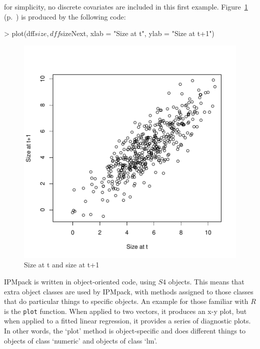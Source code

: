\documentclass{article}
\begin{document}
for simplicity, no discrete covariates are included in this first example. Figure~\ref{fig:zero} (p.~\pageref{fig:zero}) is produced by the following code:

\begin{Schunk}
\begin{Sinput}
> plot(dff$size, dff$sizeNext, xlab = "Size at t", ylab = "Size at t+1")
\end{Sinput}
\end{Schunk}
\begin{figure}
\begin{center}
\includegraphics{IPMpack_Vignette-fig0}
\end{center}
\caption{Size at t and size at t+1}
\label{fig:zero}
\end{figure}

IPMpack is written in object-oriented code, using $S4$ objects. This means that
extra object classes are used by IPMpack, with methods assigned to those classes
that do particular things to specific objects. An example for those familiar
with $R$ is the {\tt plot} function. When applied to two vectors, it produces an x-y plot, but when applied to a fitted linear regression, it provides a series of diagnostic plots. In other words, the `plot' method is object-specific and does different things to objects of class `numeric' and objects of class `lm'.
\end{document}
